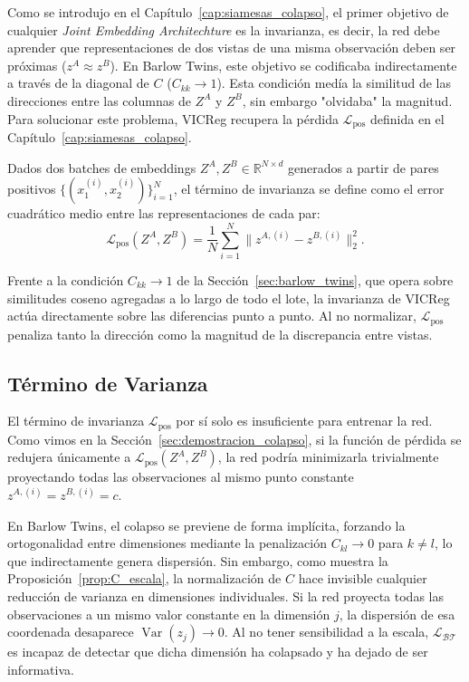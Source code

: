 Como se introdujo en el Capítulo~\ref{cap:siamesas_colapso}, el primer objetivo de cualquier \textit{Joint Embedding Architechture} es la invarianza, es decir, la red debe aprender que representaciones de dos vistas de una misma observación deben ser próximas ($z^A \approx z^B$). En Barlow Twins, este objetivo se codificaba indirectamente a través de la diagonal de $C$ ($C_{kk} \to 1$). Esta condición medía la similitud de las direcciones entre las columnas de $Z^A$ y $Z^B$, sin embargo "olvidaba" la magnitud. Para solucionar este problema, VICReg recupera la pérdida $\mathcal{L}_{\text{pos}}$ definida en el Capítulo~\ref{cap:siamesas_colapso}.

\begin{definition}
\label{def:vicreg_invarianza}
Dados dos batches de embeddings $Z^A, Z^B \in \mathbb{R}^{N \times d}$ generados a partir de pares positivos $\{(x_1^{(i)}, x_2^{(i)})\}_{i=1}^N$, el término de invarianza se define como el error cuadrático medio entre las representaciones de cada par:
\begin{equation}
\label{eq:vicreg_inv}
\mathcal{L}_{\text{pos}}(Z^A, Z^B) = \frac{1}{N} \sum_{i=1}^{N} \| z^{A,(i)} - z^{B,(i)} \|_2^2.
\end{equation}
\end{definition}

Frente a la condición $C_{kk} \to 1$ de la Sección~\ref{sec:barlow_twins}, que opera sobre similitudes coseno agregadas a lo largo de todo el lote, la invarianza de VICReg actúa directamente sobre las diferencias punto a punto. Al no normalizar, $\mathcal{L}_{\text{pos}}$ penaliza tanto la dirección como la magnitud de la discrepancia entre vistas.

\subsection{Término de Varianza}

El término de invarianza $\mathcal{L}_{\text{pos}}$ por sí solo es insuficiente para entrenar la red. Como vimos en la Sección~\ref{sec:demostracion_colapso}, si la función de pérdida se redujera únicamente a $\mathcal{L}_{\text{pos}}(Z^A, Z^B)$, la red podría minimizarla trivialmente proyectando todas las observaciones al mismo punto constante $z^{A,(i)} = z^{B,(i)} = c$.

En Barlow Twins, el colapso se previene de forma implícita, forzando la ortogonalidad entre dimensiones mediante la penalización $C_{kl} \to 0$ para $k \neq l$, lo que indirectamente genera dispersión. Sin embargo, como muestra la Proposición~\ref{prop:C_escala}, la normalización de $C$ hace invisible cualquier reducción de varianza en dimensiones individuales. Si la red proyecta todas las observaciones a un mismo valor constante en la dimensión $j$, la dispersión de esa coordenada desaparece $\operatorname{Var}(z_j) \to 0$. Al no tener sensibilidad a la escala, $\mathcal{L}_{\mathcal{BT}}$ es incapaz de detectar que dicha dimensión ha colapsado y ha dejado de ser informativa.

